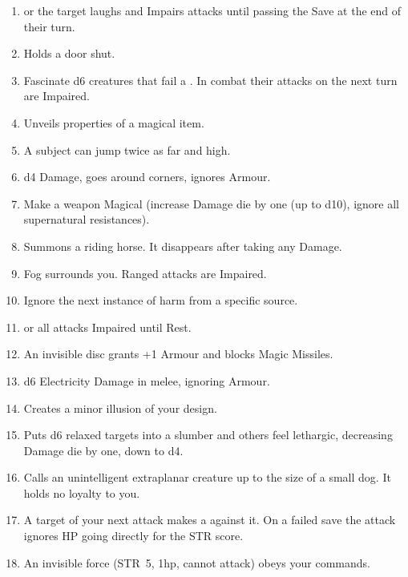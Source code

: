 \documentclass[itdr]{subfiles}
\begin{document}
\begin{enumerate}
	\item {}  or the target laughs and Impairs attacks until passing the Save at the end of their turn.
	\item {} Holds a door shut.
	\item {} Fascinate d6 creatures that fail a . In combat their attacks on the next turn are Impaired.
	\item {} Unveils properties of a magical item.
	\vfill
	\break
	\item {} A subject can jump twice as far and high.
	\item {} d4 Damage, goes around corners, ignores Armour.
	\item {} Make a weapon Magical (increase Damage die by one (up to d10), ignore all supernatural resistances).
	\item {} Summons a riding horse. It disappears after taking any Damage.
	\item {} Fog surrounds you. Ranged attacks are Impaired.
	\item {} Ignore the next instance of harm from a specific source.
	\item {}  or all attacks Impaired until Rest.
	\item {} An invisible disc grants +1 Armour and blocks Magic Missiles.
	\item {} d6 Electricity Damage in melee, ignoring Armour.
	\item {} Creates a minor illusion of your design.
	\item {} Puts d6 relaxed targets into a slumber and others feel lethargic, decreasing Damage die by one, down to d4.
	\item {} Calls an unintelligent extraplanar creature up to the size of a small dog. It holds no loyalty to you.
	\item {} A target of your next attack makes a  against it. On a failed save the attack ignores HP going directly for the STR score.
	\item {} An invisible force (STR~5, 1hp, cannot attack) obeys your commands.
\end{enumerate}

\end{document}
